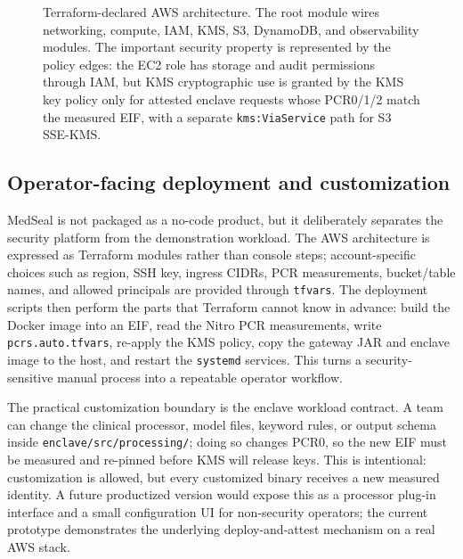 \documentclass[11pt]{article}
\begin{document}
\begin{figure}[t]
{}
\caption{Terraform-declared AWS architecture. The root module wires
networking, compute, IAM, KMS, S3, DynamoDB, and observability modules. The important
security property is represented by the policy edges: the EC2 role has
storage and audit permissions through IAM, but KMS cryptographic use is
granted by the KMS key policy only for attested enclave requests whose
PCR0/1/2 match the measured EIF, with a separate \texttt{kms:ViaService}
path for S3 SSE-KMS.}
\label{fig:tfarch}
\end{figure}

\subsection{Operator-facing deployment and customization}

MedSeal is not packaged as a no-code product, but it deliberately
separates the security platform from the demonstration workload. The
AWS architecture is expressed as Terraform modules rather than console
steps; account-specific choices such as region, SSH key, ingress CIDRs,
PCR measurements, bucket/table names, and allowed principals are
provided through \texttt{tfvars}. The deployment scripts then perform
the parts that Terraform cannot know in advance: build the Docker
image into an EIF, read the Nitro PCR measurements, write
\texttt{pcrs.auto.tfvars}, re-apply the KMS policy, copy the gateway
JAR and enclave image to the host, and restart the \texttt{systemd}
services. This turns a security-sensitive manual process into a
repeatable operator workflow.

The practical customization boundary is the enclave workload contract.
A team can change the clinical processor, model files, keyword rules,
or output schema inside \texttt{enclave/src/processing/}; doing so
changes PCR0, so the new EIF must be measured and re-pinned before KMS
will release keys. This is intentional: customization is allowed, but
every customized binary receives a new measured identity. A future
productized version would expose this as a processor plug-in interface
and a small configuration UI for non-security operators; the current
prototype demonstrates the underlying deploy-and-attest mechanism on a
real AWS stack.
\end{document}
